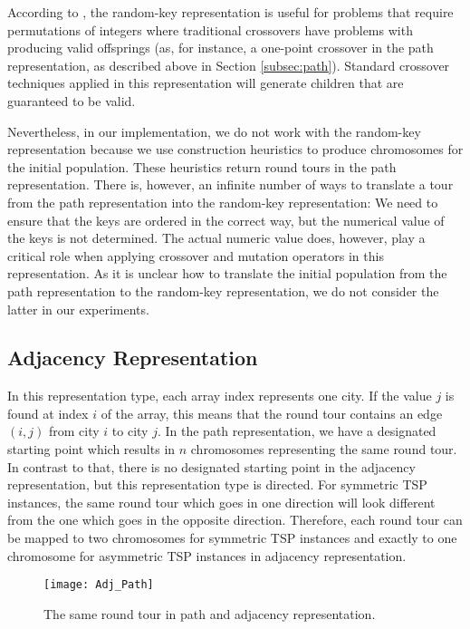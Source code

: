 According to \citeauthor{snyder2006random} \cite{snyder2006random}, the random-key representation is useful for problems that require permutations of integers where traditional crossovers have problems with producing valid offsprings (as, for instance, a one-point crossover in the path representation, as described above in Section \ref{subsec:path}). Standard crossover techniques applied in this representation will generate children that are guaranteed to be valid.\par 

Nevertheless, in our implementation, we do not work with the random-key representation because we use construction heuristics to produce chromosomes for the initial population. These heuristics return round tours in the path representation. There is, however, an infinite number of ways to translate a tour from the path representation into the random-key representation: We need to ensure that the keys are ordered in the correct way, but the numerical value of the keys is not determined. The actual numeric value does, however, play a critical role when applying crossover and mutation operators in this representation. As it is unclear how to translate the initial population from the path representation to the random-key representation, we do not consider the latter in our experiments.\par 


\subsection{Adjacency Representation}
\label{subsec:adjacency}

In this representation type, each array index represents one city. If the value $j$ is found at index $i$ of the array, this means that the round tour contains an edge $(i, j)$ from city $i$ to city $j$.  In the path representation, we have a designated starting point which results in $n$ chromosomes representing the same round tour. In contrast to that, there is no designated starting point in the adjacency representation, but this representation type is directed. For symmetric TSP instances, the same round tour which goes in one direction will look different from the one which goes in the opposite direction. Therefore, each round tour can be mapped to two chromosomes for symmetric TSP instances and exactly to one chromosome for asymmetric TSP instances in adjacency representation.
\begin{figure}[htp] \centering
	\centering
	\texttt{[image: Adj\_Path]}
	\caption{The same round tour in path and adjacency representation. }
	\label{Adj_Path}
\end{figure}

